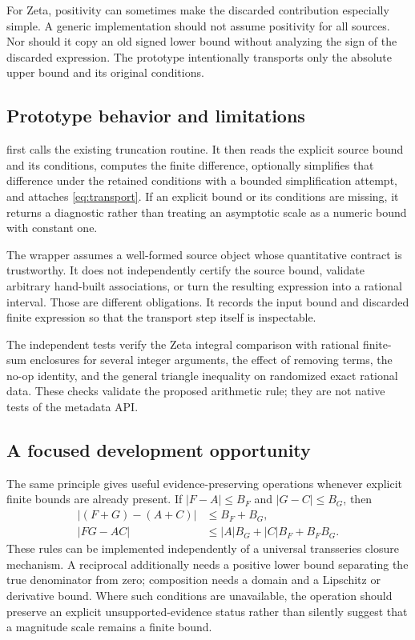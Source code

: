 \documentclass[11pt,a4paper]{article}
\newcommand{\code}[1]{\texttt{\detokenize{#1}}}
\begin{document}
For Zeta, positivity can sometimes make the discarded contribution especially simple. A generic implementation should not assume positivity for all sources. Nor should it copy an old signed lower bound without analyzing the sign of the discarded expression. The prototype intentionally transports only the absolute upper bound and its original conditions.

\subsection{Prototype behavior and limitations}

\code{BoundPreservingTruncate} first calls the existing truncation routine. It then reads the explicit source bound and its conditions, computes the finite difference, optionally simplifies that difference under the retained conditions with a bounded simplification attempt, and attaches \eqref{eq:transport}. If an explicit bound or its conditions are missing, it returns a diagnostic rather than treating an asymptotic scale as a numeric bound with constant one.

The wrapper assumes a well-formed source object whose quantitative contract is trustworthy. It does not independently certify the source bound, validate arbitrary hand-built associations, or turn the resulting expression into a rational interval. Those are different obligations. It records the input bound and discarded finite expression so that the transport step itself is inspectable.

The independent tests verify the Zeta integral comparison with rational finite-sum enclosures for several integer arguments, the effect of removing terms, the no-op identity, and the general triangle inequality on randomized exact rational data. These checks validate the proposed arithmetic rule; they are not native tests of the metadata API.

\subsection{A focused development opportunity}

The same principle gives useful evidence-preserving operations whenever explicit finite bounds are already present. If $|F-A|\le B_F$ and $|G-C|\le B_G$, then
\begin{align}
 |(F+G)-(A+C)|&\le B_F+B_G,\\
 |FG-AC|&\le |A|B_G+|C|B_F+B_FB_G.
\end{align}
These rules can be implemented independently of a universal transseries closure mechanism. A reciprocal additionally needs a positive lower bound separating the true denominator from zero; composition needs a domain and a Lipschitz or derivative bound. Where such conditions are unavailable, the operation should preserve an explicit unsupported-evidence status rather than silently suggest that a magnitude scale remains a finite bound.
\end{document}
